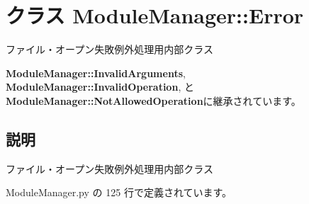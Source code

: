\section{クラス ModuleManager::Error}
\label{classsource__py_1_1_module_manager_1_1_module_manager_1_1_error}
ファイル・オープン失敗例外処理用内部クラス  


{\bf ModuleManager::InvalidArguments}, {\bf ModuleManager::InvalidOperation}, と {\bf ModuleManager::NotAllowedOperation}に継承されています。



\subsection{説明}
ファイル・オープン失敗例外処理用内部クラス 

 ModuleManager.py の 125 行で定義されています。